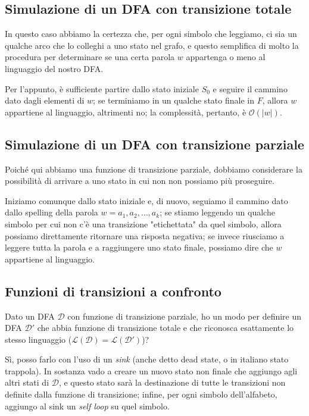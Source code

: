 \documentclass[class=book, crop=false, oneside, 12pt]{standalone}
\begin{document}
\subsection{Simulazione di un DFA con transizione totale}
In questo caso abbiamo la certezza che, per ogni  simbolo che leggiamo, ci sia un qualche arco che lo colleghi a uno stato nel grafo, e questo semplifica di molto la procedura per determinare se una certa parola \(w\) appartenga o meno al linguaggio del nostro DFA.

Per l'appunto, è sufficiente partire dallo stato iniziale \(S_0\) e seguire il cammino dato dagli elementi di \(w\); se terminiamo in un qualche stato finale in \(F\), allora \(w\) appartiene al linguaggio, altrimenti no; la complessità, pertanto, è \(\mathcal{O}(|w|)\).

\subsection{Simulazione di un DFA con transizione parziale}
Poiché qui abbiamo una funzione di transizione parziale, dobbiamo considerare la possibilità di arrivare a uno stato in cui non non possiamo più proseguire. 

Iniziamo comunque dallo stato iniziale e, di nuovo, seguiamo il cammino dato dallo spelling della parola \(w = a_1, a_2, \ldots, a_k\); se stiamo leggendo un qualche simbolo per cui non c'è una transizione "etichettata" da quel simbolo, allora possiamo direttamente ritornare una risposta negativa; se invece riusciamo a leggere tutta la parola e a raggiungere uno stato finale, possiamo dire che \(w\) appartiene al linguaggio.

\subsection{Funzioni di transizioni a confronto}
Dato un DFA \(\mathcal{D}\) con funzione di transizione parziale, ho un modo per definire un DFA \(\mathcal{D}'\) che abbia funzione di transizione totale e che riconosca esattamente lo stesso linguaggio (\(\mathcal{L(D) = \mathcal{L}(\mathcal{D}')}\))?

Sì, posso farlo con l'uso di un \emph{sink} (anche detto dead state, o in italiano stato trappola). In sostanza vado a creare un nuovo stato non finale che aggiungo agli altri stati di \(\mathcal{D}\), e questo stato sarà la destinazione di tutte le transizioni non definite dalla funzione di transizione; infine, per ogni simbolo dell'alfabeto, aggiungo al sink un \emph{self loop} su quel simbolo.
\end{document}
